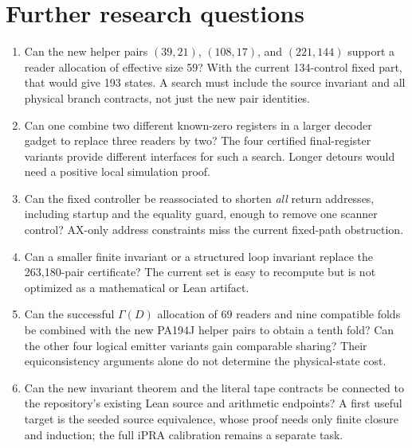 \documentclass[11pt,letterpaper]{article}
\begin{document}
\section{Further research questions}

\begin{enumerate}
\item Can the new helper pairs \((39,21)\), \((108,17)\), and
      \((221,144)\) support a reader allocation of effective size 59?
      With the current 134-control fixed part, that would give 193 states.
      A search must include the source invariant and all physical branch
      contracts, not just the new pair identities.
\item Can one combine two different known-zero registers in a larger
      decoder gadget to replace three readers by two? The four certified
      final-register variants provide different interfaces for such a
      search. Longer detours would need a positive local simulation proof.
\item Can the fixed controller be reassociated to shorten \emph{all}
      return addresses, including startup and the equality guard, enough
      to remove one scanner control? AX-only address constraints miss
      the current fixed-path obstruction.
\item Can a smaller finite invariant or a structured loop invariant
      replace the 263,180-pair certificate? The current set is easy to
      recompute but is not optimized as a mathematical or Lean artifact.
\item Can the successful \(\Gamma(D)\) allocation of 69 readers and nine
      compatible folds be combined with the new PA194J helper pairs to
      obtain a tenth fold? Can the other four logical emitter variants
      gain comparable sharing? Their equiconsistency arguments alone do
      not determine the physical-state cost.
\item Can the new invariant theorem and the literal tape contracts be
      connected to the repository's existing Lean source and arithmetic
      endpoints? A first useful target is the seeded source equivalence,
      whose proof needs only finite closure and induction; the full iPRA
      calibration remains a separate task.
\end{enumerate}
\end{document}
